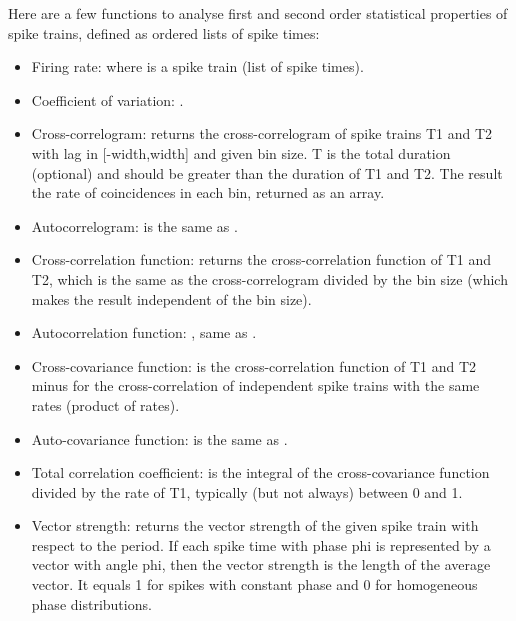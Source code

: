 \documentclass[letterpaper,10pt,english]{manual}
\begin{document}
Here are a few functions to analyse first and second order statistical properties
of spike trains, defined as ordered lists of spike times:
\begin{itemize}
\item {} 
Firing rate:  where  is a spike train (list of spike times).

\item {} 
Coefficient of variation: .

\item {} 
Cross-correlogram:  returns
the cross-correlogram of spike trains T1 and T2 with lag in {[}-width,width{]} and given bin size.
T is the total duration (optional) and should be greater than the duration of T1 and T2.
The result the rate of coincidences in each bin, returned as an array.

\item {} 
Autocorrelogram:  is the same as
.

\item {} 
Cross-correlation function:  returns the cross-correlation
function of T1 and T2, which is the same as the cross-correlogram divided by the bin size (which makes the
result independent of the bin size).

\item {} 
Autocorrelation function: , same as
.

\item {} 
Cross-covariance function:  is the cross-correlation
function of T1 and T2 minus for the cross-correlation of independent spike trains with the same rates
(product of rates).

\item {} 
Auto-covariance function:  is the same as
.

\item {} 
Total correlation coefficient:  is
the integral of the cross-covariance function divided by the rate of T1, typically (but not
always) between 0 and 1.

\item {} 
Vector strength:  returns the vector strength of the given
spike train with respect to the period. If each spike time with phase phi is represented by
a vector with angle phi, then the vector strength is the length of the average vector.
It equals 1 for spikes with constant phase and 0 for homogeneous phase distributions.

\end{itemize}
\end{document}
